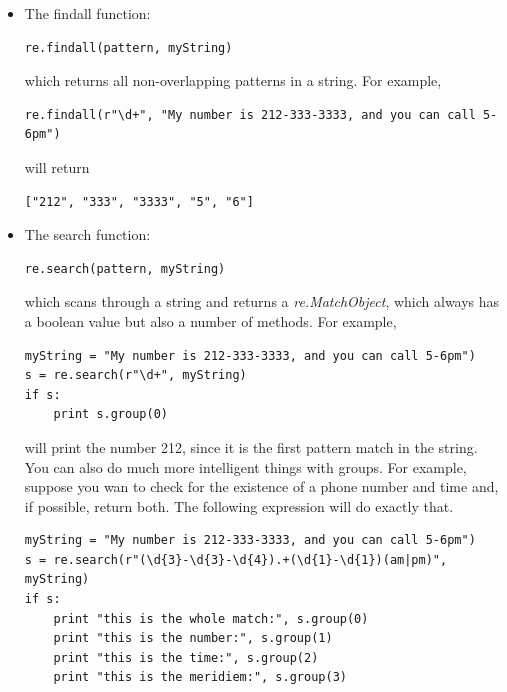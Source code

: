 \begin{itemize}

    \item The findall function:

        
\begin{verbatim}
re.findall(pattern, myString)
\end{verbatim}

        which returns all non-overlapping patterns in a string. For example,

\begin{verbatim}
re.findall(r"\d+", "My number is 212-333-3333, and you can call 5-6pm")
\end{verbatim}

will return 

\begin{verbatim}
["212", "333", "3333", "5", "6"]
\end{verbatim}




    \item The search function:

\begin{verbatim}
re.search(pattern, myString)
\end{verbatim}

        which scans through a string and returns a \textit{re.MatchObject}, which always has a boolean value but also a number of methods. 
        For example, 

\begin{verbatim}
myString = "My number is 212-333-3333, and you can call 5-6pm")
s = re.search(r"\d+", myString)
if s:
    print s.group(0)
\end{verbatim}

will print the number 212, since it is the first pattern match in the string. You can also do much more intelligent things with groups. For example, suppose you wan to check for the existence of a phone number and time and, if possible, return both. The following expression will do exactly that. 

\begin{verbatim}
myString = "My number is 212-333-3333, and you can call 5-6pm")
s = re.search(r"(\d{3}-\d{3}-\d{4}).+(\d{1}-\d{1})(am|pm)", myString)
if s:
    print "this is the whole match:", s.group(0)
    print "this is the number:", s.group(1)
    print "this is the time:", s.group(2)
    print "this is the meridiem:", s.group(3) 
\end{verbatim}



\end{itemize}
